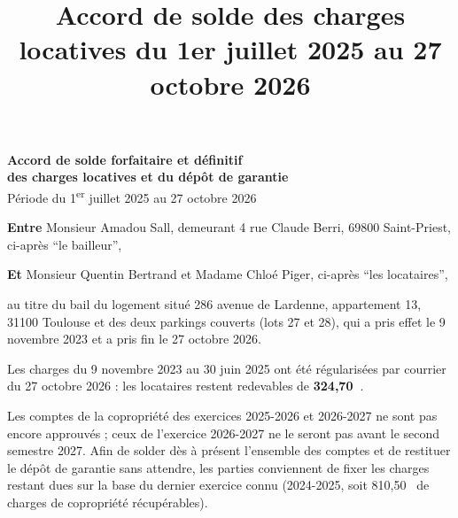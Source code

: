 \documentclass[11pt,a4paper,sans]{moderncv}
\title{Accord de solde des charges locatives du 1er juillet 2025 au 27 octobre 2026}
\newcommand{\nomBailleur}{Monsieur Amadou Sall, demeurant 4 rue Claude Berri, 69800 Saint-Priest}
\newcommand{\nomLocataire}{Monsieur Quentin Bertrand et Madame Chloé Piger}
\newcommand{\adresseLogement}{286 avenue de Lardenne, appartement 13, 31100 Toulouse}
\newcommand{\article}[1]{\par\medskip{\color{primary}\bfseries #1}\par\smallskip}
\begin{document}

    \begin{center}
        {\Large\color{primary}\bfseries Accord de solde forfaitaire et définitif\\des charges locatives et du dépôt de garantie}\\[0.5em]
        Période du 1\textsuperscript{er} juillet 2025 au 27 octobre 2026
    \end{center}

    \medskip
    \textbf{Entre} \nomBailleur, ci-après \enquote{le bailleur},

    \textbf{Et} \nomLocataire, ci-après \enquote{les locataires},

    au titre du bail du logement situé \adresseLogement{} et des deux parkings couverts (lots 27 et 28), qui a pris effet le 9 novembre 2023 et a pris fin le 27 octobre 2026.

    \article{Préambule}
    Les charges du 9 novembre 2023 au 30 juin 2025 ont été régularisées par courrier du 27 octobre 2026 : les locataires restent redevables de \textbf{324,70~\texteuro}.

    Les comptes de la copropriété des exercices 2025-2026 et 2026-2027 ne sont pas encore approuvés ; ceux de l'exercice 2026-2027 ne le seront pas avant le second semestre 2027. Afin de solder dès à présent l'ensemble des comptes et de restituer le dépôt de garantie sans attendre, les parties conviennent de fixer les charges restant dues sur la base du dernier exercice connu (2024-2025, soit 810,50~\texteuro{} de charges de copropriété récupérables).
\end{document}
